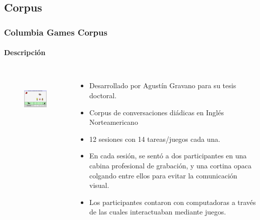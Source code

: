 \subsection{Corpus}
\begin{frame}
  \frametitle{Columbia Games Corpus}
  \framesubtitle{Descripción}
  \begin{columns}
      \begin{figure}
        \includegraphics[height=100px,width=\textwidth]{images/columbia_games_color.jpg}
      \end{figure}


    \begin{itemize}
      \item Desarrollado por Agustín Gravano para su tesis doctoral.
      \item Corpus de conversaciones diádicas en Inglés Norteamericano
      \item 12 sesiones con 14 tareas/juegos cada una.
      \item En cada sesión, se sentó a dos participantes en una cabina profesional de grabación, y una cortina opaca colgando entre ellos para evitar la comunicación visual.
      \item Los participantes contaron con computadoras a través de las cuales interactuaban mediante juegos.
    \end{itemize}
  \end{columns}
\end{frame}


